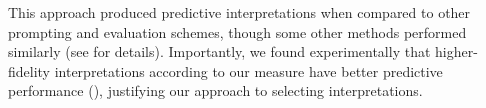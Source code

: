 This approach produced predictive interpretations when compared to other prompting and evaluation schemes, though some other methods performed similarly (see  for details). Importantly, we found experimentally that higher-fidelity interpretations according to our measure have better predictive performance (), justifying our approach to selecting interpretations.





































